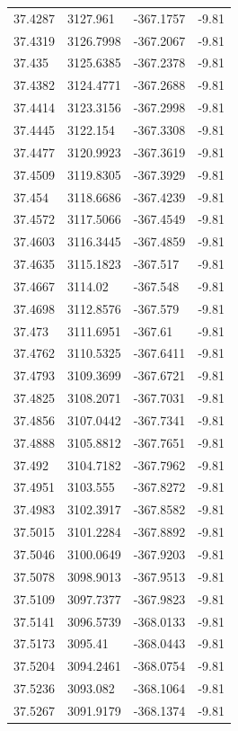 \begin{table}[H]
\begin{tabular}{llll}
37.4287 & 3127.961 & -367.1757 & -9.81 \\
37.4319 & 3126.7998 & -367.2067 & -9.81 \\
37.435 & 3125.6385 & -367.2378 & -9.81 \\
37.4382 & 3124.4771 & -367.2688 & -9.81 \\
37.4414 & 3123.3156 & -367.2998 & -9.81 \\
37.4445 & 3122.154 & -367.3308 & -9.81 \\
37.4477 & 3120.9923 & -367.3619 & -9.81 \\
37.4509 & 3119.8305 & -367.3929 & -9.81 \\
37.454 & 3118.6686 & -367.4239 & -9.81 \\
37.4572 & 3117.5066 & -367.4549 & -9.81 \\
37.4603 & 3116.3445 & -367.4859 & -9.81 \\
37.4635 & 3115.1823 & -367.517 & -9.81 \\
37.4667 & 3114.02 & -367.548 & -9.81 \\
37.4698 & 3112.8576 & -367.579 & -9.81 \\
37.473 & 3111.6951 & -367.61 & -9.81 \\
37.4762 & 3110.5325 & -367.6411 & -9.81 \\
37.4793 & 3109.3699 & -367.6721 & -9.81 \\
37.4825 & 3108.2071 & -367.7031 & -9.81 \\
37.4856 & 3107.0442 & -367.7341 & -9.81 \\
37.4888 & 3105.8812 & -367.7651 & -9.81 \\
37.492 & 3104.7182 & -367.7962 & -9.81 \\
37.4951 & 3103.555 & -367.8272 & -9.81 \\
37.4983 & 3102.3917 & -367.8582 & -9.81 \\
37.5015 & 3101.2284 & -367.8892 & -9.81 \\
37.5046 & 3100.0649 & -367.9203 & -9.81 \\
37.5078 & 3098.9013 & -367.9513 & -9.81 \\
37.5109 & 3097.7377 & -367.9823 & -9.81 \\
37.5141 & 3096.5739 & -368.0133 & -9.81 \\
37.5173 & 3095.41 & -368.0443 & -9.81 \\
37.5204 & 3094.2461 & -368.0754 & -9.81 \\
37.5236 & 3093.082 & -368.1064 & -9.81 \\
37.5267 & 3091.9179 & -368.1374 & -9.81 \\

\end{tabular}
\end{table}
